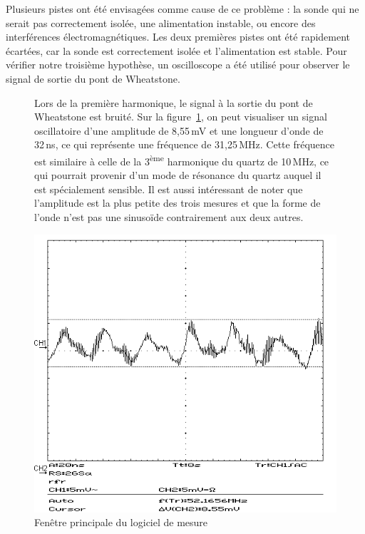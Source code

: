 Plusieurs pistes ont été envisagées comme cause de ce problème : la sonde qui ne serait pas correctement isolée, une alimentation instable, ou encore des interférences électromagnétiques.
Les deux premières pistes ont été rapidement écartées, car la sonde est correctement isolée et l'alimentation est stable.
Pour vérifier notre troisième hypothèse, un oscilloscope a été utilisé pour observer le signal de sortie du pont de Wheatstone.

\begin{figure}[H]
    \centering
    \begin{minipage}{0.48\textwidth}
        \small
        Lors de la première harmonique, le signal à la sortie du pont de Wheatstone est bruité. 
        Sur la figure~\ref{fig:10mhzbruit}, on peut visualiser un signal oscillatoire d'une amplitude de 8,55\,mV et une longueur d'onde de 32\,ns, ce qui représente une fréquence de 31,25\,MHz.
        Cette fréquence est similaire à celle de la 3\textsuperscript{ème} harmonique du quartz de 10\,MHz, ce qui pourrait provenir d'un mode de résonance du quartz auquel il est spécialement sensible.
        Il est aussi intéressant de noter que l'amplitude est la plus petite des trois mesures et que la forme de l'onde n'est pas une sinusoïde contrairement aux deux autres.
    \end{minipage}\hfill
    \begin{minipage}{0.48\textwidth}
        \centering
        \includegraphics[width=\textwidth]{assets/figures/SCR00006.png}
        \caption{Fenêtre principale du logiciel de mesure}
        \label{fig:10mhzbruit}
    \end{minipage}
\end{figure}

